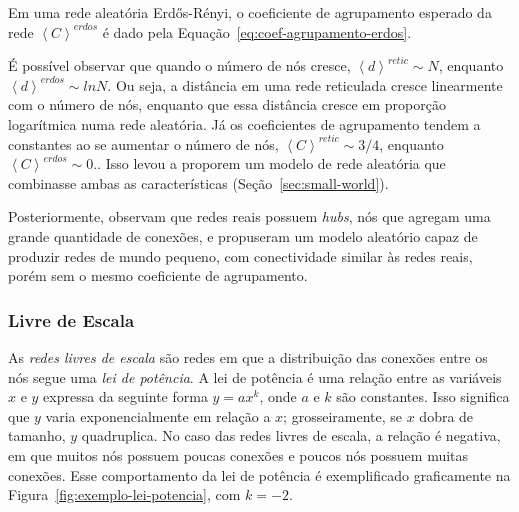 \documentclass[12pt,a4paper,final]{article}
\newcommand{\avg}[1]{\left\langle #1 \right\rangle} %
\begin{document}
Em uma rede aleatória Erdős-Rényi, o coeficiente de agrupamento esperado da rede $\avg{C}^\textit{erdos}$ é dado pela Equação~\ref{eq:coef-agrupamento-erdos}.

É possível observar que quando o número de nós cresce, $\avg{d}^\textit{retic} \sim N$, enquanto $\avg{d}^\textit{erdos} \sim ln N$. Ou seja, a distância em uma rede reticulada cresce linearmente com o número de nós, enquanto que essa distância cresce em proporção logarítmica numa rede aleatória. Já os coeficientes de agrupamento tendem a constantes ao se aumentar o número de nós, $\avg{C}^\textit{retic} \sim 3 / 4$, enquanto $\avg{C}^\textit{erdos} \sim 0$.. Isso levou  a proporem um modelo de rede aleatória que combinasse ambas as características (Seção~\ref{sec:small-world}).

Posteriormente,  observam que redes reais possuem \textit{hubs}, nós que agregam uma grande quantidade de conexões, e propuseram um modelo aleatório capaz de produzir redes de mundo pequeno, com conectividade similar às redes reais, porém sem o mesmo coeficiente de agrupamento.

\subsubsection{Livre de Escala} \label{sec:scale-free}

As \textit{redes livres de escala} são redes em que a distribuição das conexões entre os nós segue uma \textit{lei de potência}. A lei de potência é uma relação entre as variáveis $x$ e $y$ expressa da seguinte forma $y = ax^{k}$, onde $a$ e $k$ são constantes. Isso significa que $y$ varia exponencialmente em relação a $x$; grosseiramente, se $x$ dobra de tamanho, $y$ quadruplica. No caso das redes livres de escala, a relação é negativa, em que muitos nós possuem poucas conexões e poucos nós possuem muitas conexões. Esse comportamento da lei de potência é exemplificado graficamente na Figura~\ref{fig:exemplo-lei-potencia}, com $k = -2$.
\end{document}
